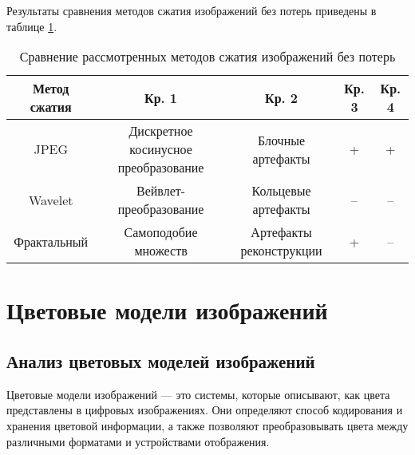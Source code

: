 \clearpage

Результаты сравнения методов сжатия изображений без потерь приведены в таблице \ref{tbl:compare_realizations2}.
\begin{table}[H]
    \centering
	\caption{Сравнение рассмотренных методов сжатия изображений без потерь}
    \label{tbl:compare_realizations2}
	\begin{tabular}{|c|c|c|c|c|}
        \hline
        \textbf{Метод сжатия} & \textbf{Кр. 1} & \textbf{Кр. 2} & \textbf{Кр. 3} & \textbf{Кр. 4}
        \\ \hline
        JPEG        & \begin{minipage}[t]{5.5cm}\centering Дискретное косинусное \newline преобразование \end{minipage} & \begin{minipage}[t]{3.1cm}\centering Блочные \newline артефакты \newline \end{minipage} & + & + \\ \hline
        Wavelet     & Вейвлет-преобразование & \begin{minipage}[t]{3.1cm}\centering Кольцевые \newline артефакты \newline \end{minipage}     & -- & --  \\ \hline 
        Фрактальный & Самоподобие множеств   & \begin{minipage}[t]{3.1cm}\centering Артефакты \newline реконструкции \newline \end{minipage} & +  & -- \\ \hline
    \end{tabular}
\end{table}

\section{Цветовые модели изображений}

\subsection{Анализ цветовых моделей изображений}

Цветовые модели изображений --- это системы, которые описывают, как цвета представлены в цифровых изображениях. Они определяют способ кодирования и хранения цветовой информации, а также позволяют преобразовывать цвета между различными форматами и устройствами отображения.

